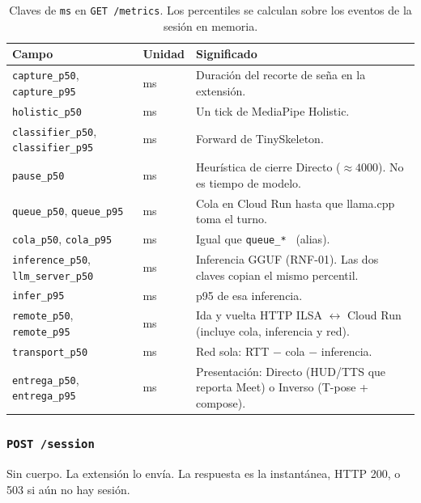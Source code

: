 \begin{table}[H]
  \centering
  \caption{Claves de \texttt{ms} en \texttt{GET /metrics}. Los percentiles se calculan sobre los eventos de la sesión en memoria.}
  \label{tab:api-local-metrics-ms}
  \small
  \begin{tabularx}{\textwidth}{@{}>{\raggedright\arraybackslash}p{5.15cm} l >{\raggedright\arraybackslash}X@{}}
    \toprule
    \textbf{Campo} & \textbf{Unidad} & \textbf{Significado} \\
    \midrule
    \texttt{capture\_p50}, \texttt{capture\_p95} & ms & Duración del recorte de seña en la extensión. \\
    \texttt{holistic\_p50} & ms & Un tick de MediaPipe Holistic. \\
    \texttt{classifier\_p50}, \texttt{classifier\_p95} & ms & Forward de TinySkeleton. \\
    \texttt{pause\_p50} & ms & Heurística de cierre Directo ($\approx 4000$). No es tiempo de modelo. \\
    \texttt{queue\_p50}, \texttt{queue\_p95} & ms & Cola en Cloud Run hasta que llama.cpp toma el turno. \\
    \texttt{cola\_p50}, \texttt{cola\_p95} & ms & Igual que \texttt{queue\_* } (alias). \\
    \texttt{inference\_p50}, \texttt{llm\_server\_p50} & ms & Inferencia GGUF (RNF-01). Las dos claves copian el mismo percentil. \\
    \texttt{infer\_p95} & ms & p95 de esa inferencia. \\
    \texttt{remote\_p50}, \texttt{remote\_p95} & ms & Ida y vuelta HTTP ILSA $\leftrightarrow$ Cloud Run (incluye cola, inferencia y red). \\
    \texttt{transport\_p50} & ms & Red sola: RTT $-$ cola $-$ inferencia. \\
    \texttt{entrega\_p50}, \texttt{entrega\_p95} & ms & Presentación: Directo (HUD/TTS que reporta Meet) o Inverso (T-pose + compose). \\
    \bottomrule
  \end{tabularx}
\end{table}

\subsubsection{\texttt{POST /session}}

Sin cuerpo. La extensión lo envía. La respuesta es la instantánea, HTTP 200, o 503 si aún no hay sesión.

